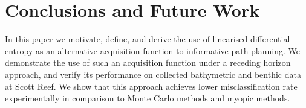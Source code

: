 \documentclass{article}
\begin{document}
%			
		
\section{Conclusions and Future Work}
\label{Section:Conclusion}

	In this paper we motivate, define, and derive the use of linearised differential entropy as an alternative acquisition function to informative path planning. We demonstrate the use of such an acquisition function under a receding horizon approach, and verify its performance on collected bathymetric and benthic data at Scott Reef. We show that this approach achieves lower misclassification rate experimentally in comparison to Monte Carlo methods and myopic methods.
	
\end{document}
